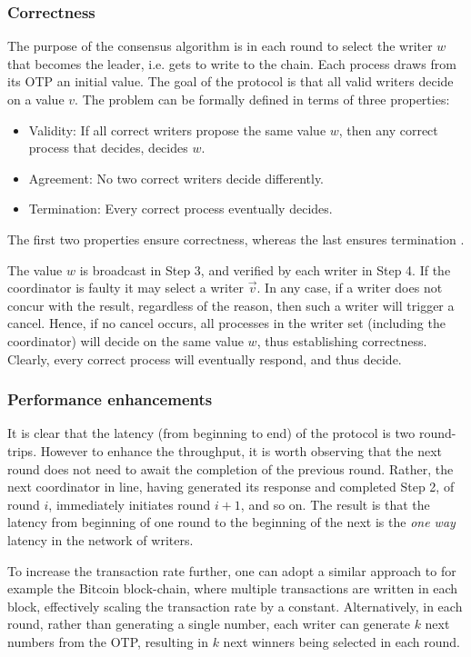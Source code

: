 \documentclass[10pt]{article}
\begin{document}
\subsubsection*{Correctness}

The purpose of the consensus algorithm is in each round to select the writer $w$ that becomes the leader, i.e. gets to write to the chain. Each process draws from its OTP an initial value. The goal of the protocol is that all valid writers decide on a value $v$. The problem can be formally defined in terms of three properties:
\begin{itemize}
    \item Validity: If all correct writers propose the same value $w$, then any correct process that decides, decides $w$.
    \item Agreement: No two correct writers decide differently.
    \item Termination: Every correct process eventually decides.
\end{itemize}

The first two properties ensure correctness, whereas the last ensures termination \cite{Alpern-Schneider}. 

The value $w$ is broadcast in Step 3, and verified by each writer in Step 4. If the coordinator is faulty it may select a writer $\vec{v}$. In any case, if a writer does not concur with the result, regardless of the reason, then such a writer will trigger a cancel. Hence, if no cancel occurs, all processes in the writer set (including the coordinator) will decide on the same value $w$, thus establishing correctness. Clearly, every correct process will eventually respond, and thus decide.



\subsubsection*{Performance enhancements}
It is clear that the latency (from beginning to end) of the protocol is two round-trips. However to enhance the throughput, it is worth observing that the next round does not need to await the completion of the previous round. Rather, the next coordinator in line, having generated its response and completed Step 2, of round $i$, immediately initiates round $i+1$, and so on. The result is that the latency from beginning of one round to the beginning of the next is the \emph{one way} latency in the network of writers.

To increase the transaction rate further, one can adopt a similar approach to for example the Bitcoin block-chain, where multiple transactions are written in each block, effectively scaling the transaction rate by a constant. Alternatively, in each round, rather than generating a single number, each writer can generate $k$ next numbers from the OTP, resulting in $k$ next winners being selected in each round.
\end{document}
